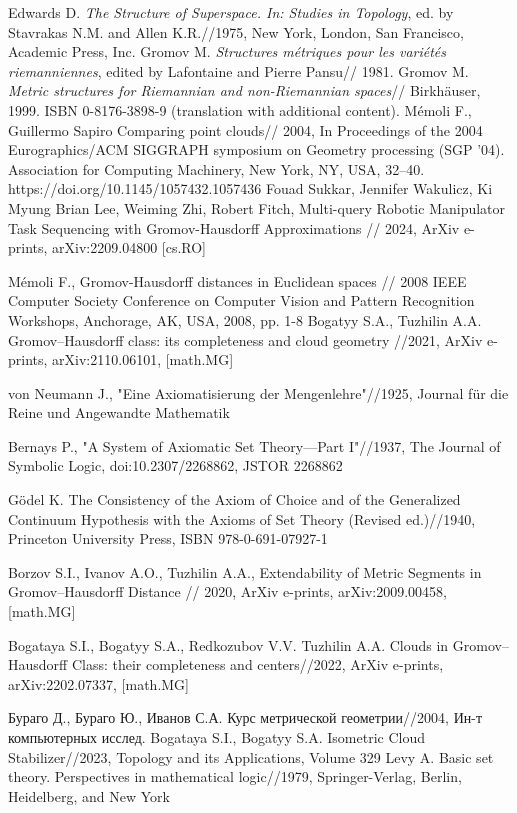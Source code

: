 \documentclass[11pt,twoside,draft
]{article}
\begin{document}
\begin{thebibliography}{99}
	
 Edwards D. \emph{The Structure of Superspace. In: Studies in Topology}, ed. by Stavrakas N.M. and Allen K.R.//1975, New York, London, San Francisco, Academic Press, Inc.
 Gromov M. \emph{Structures m\'etriques pour les vari\'et\'es riemanniennes}, edited by Lafontaine and Pierre Pansu// 1981.
 Gromov M. \emph{Metric structures for Riemannian and non-Riemannian spaces}// Birkh\"auser, 1999. ISBN 0-8176-3898-9 (translation with additional content).
Mémoli F., Guillermo Sapiro Comparing point clouds// 2004, In Proceedings of the 2004 Eurographics/ACM SIGGRAPH symposium on Geometry processing (SGP '04). Association for Computing Machinery, New York, NY, USA, 32–40. https://doi.org/10.1145/1057432.1057436
 Fouad Sukkar, Jennifer Wakulicz, Ki Myung Brian Lee, Weiming Zhi, Robert Fitch, Multi-query Robotic Manipulator Task Sequencing with Gromov-Hausdorff Approximations // 2024, ArXiv e-prints,
arXiv:2209.04800 [cs.RO]


Mémoli F., Gromov-Hausdorff distances in Euclidean spaces // 2008 IEEE Computer Society Conference on Computer Vision and Pattern Recognition Workshops, Anchorage, AK, USA, 2008, pp. 1-8
Bogatyy S.A., Tuzhilin A.A. Gromov–Hausdorff class: its completeness and cloud geometry //2021, ArXiv e-prints,
arXiv:2110.06101, [math.MG]

von Neumann J., "Eine Axiomatisierung der Mengenlehre"//1925, Journal für die Reine und Angewandte Mathematik 

Bernays P., "A System of Axiomatic Set Theory—Part I"//1937, The Journal of Symbolic Logic, doi:10.2307/2268862, JSTOR 2268862

    Gödel K. The Consistency of the Axiom of Choice and of the Generalized Continuum Hypothesis with the Axioms of Set Theory (Revised ed.)//1940, Princeton University Press,  ISBN 978-0-691-07927-1

Borzov S.I., Ivanov A.O., Tuzhilin A.A., Extendability of Metric Segments in
Gromov–Hausdorff Distance // 2020, ArXiv e-prints,
arXiv:2009.00458, [math.MG] 

    Bogataya S.I., Bogatyy S.A., Redkozubov V.V. Tuzhilin A.A. Clouds in Gromov–Hausdorff Class: their
	completeness and centers//2022, ArXiv e-prints,
arXiv:2202.07337, [math.MG]



   Бураго Д., Бураго Ю., Иванов С.А. Курс метрической геометрии//2004, Ин-т компьютерных исслед.
Bogataya S.I., Bogatyy S.A. Isometric Cloud Stabilizer//2023, Topology and its Applications,
Volume 329
Levy A. Basic set theory. Perspectives in mathematical logic//1979, Springer-Verlag, Berlin, Heidelberg, and New York



		

\end{thebibliography}
\end{document}
